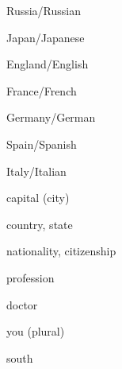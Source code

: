 \begin{flashcard}{\LARGE Russia/Russian}
\LARGE {}
\end{flashcard}
\begin{flashcard}{\LARGE Japan/Japanese}
\LARGE {}
\end{flashcard}
\begin{flashcard}{\LARGE England/English}
\LARGE {}
\end{flashcard}
\begin{flashcard}{\LARGE France/French}
\LARGE {}
\end{flashcard}
\begin{flashcard}{\LARGE Germany/German}
\LARGE {}
\end{flashcard}
\begin{flashcard}{\LARGE Spain/Spanish}
\LARGE {}
\end{flashcard}
\begin{flashcard}{\LARGE Italy/Italian}
\LARGE {}
\end{flashcard}
\begin{flashcard}{\LARGE capital (city)}
\LARGE {}
\end{flashcard}
\begin{flashcard}{\LARGE country, state}
\LARGE {}
\end{flashcard}
\begin{flashcard}{\LARGE nationality, citizenship}
\LARGE {}
\end{flashcard}
\begin{flashcard}{\LARGE profession}
\LARGE {}
\end{flashcard}
\begin{flashcard}{\LARGE doctor}
\LARGE {}
\end{flashcard}
\begin{flashcard}{\LARGE you (plural)}
\LARGE {}
\end{flashcard}
\begin{flashcard}{\LARGE south}
\LARGE {}
\end{flashcard}
